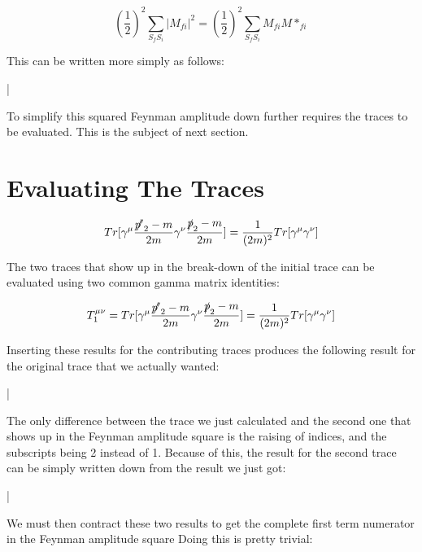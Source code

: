 \documentclass[a4]{article}
\begin{document}
    \begin{equation}
        (\frac{1}{2})^2 \sum_{S_f S_i} |M_{f i}|^2 = (\frac{1}{2})^2 \sum_{S_f S_i} M_{fi} M*_{fi}
    \end{equation}

    This can be written more simply as follows:

    \begin{framed}
        |
    \end{framed}

    To simplify this squared Feynman amplitude down further requires the traces to be evaluated. This is the subject of next section.

    \section*{Evaluating The Traces}

    \begin{equation}
        Tr [\gamma^\mu \frac{\slashed{p'}_2 - m}{2m} \gamma^\nu \frac{\slashed{p}_2 - m}{2 m}] = \frac{1}{(2m)^2} Tr[\gamma^\mu \gamma^\nu]
    \end{equation}

    The two traces that show up in the break-down of the initial trace can be evaluated using two common gamma matrix identities:

    \begin{equation}
        T_1^{\mu \nu} = Tr [\gamma^\mu \frac{\slashed{p'}_2 - m}{2m} \gamma^\nu \frac{\slashed{p}_2 - m}{2 m}] = \frac{1}{(2m)^2} Tr[\gamma^\mu \gamma^\nu]
    \end{equation}

    Inserting these results for the contributing traces produces the following result for the original trace that we actually wanted:

    \begin{framed}
        |
    \end{framed}

    The only difference between the trace we just calculated and the second one that shows up in the Feynman amplitude square is the raising of indices, and the subscripts being 2 instead of 1. Because of this, the result for the second trace can be
    simply written down from the result we just got:

    \begin{framed}
        |
    \end{framed}

    We must then contract these two results to get the complete first term numerator in the Feynman amplitude square Doing this is pretty trivial: 
\end{document}
